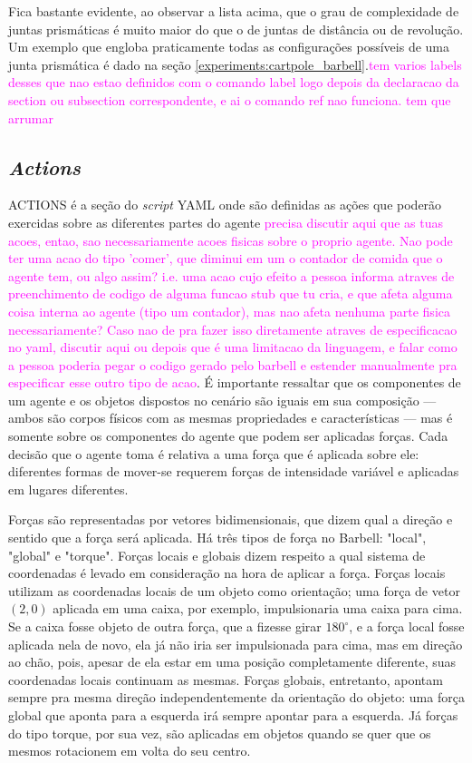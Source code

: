 \documentclass[cic,tc]{iiufrgs}
\newcommand\bruno[1]{\textcolor{magenta}{#1}}
\begin{document}
Fica bastante evidente, ao observar a lista acima, que o grau de complexidade de juntas prismáticas é muito maior do que o de juntas de distância ou de
revolução. Um exemplo que engloba praticamente todas as configurações possíveis de uma junta prismática é dado na seção \ref{experiments:cartpole_barbell}.\bruno{tem varios labels desses que nao estao definidos com o comando label logo depois da declaracao da section ou subsection correspondente, e ai o comando ref nao funciona. tem que arrumar}

\subsection{\textit{Actions}}
ACTIONS é a seção do \textit{script} YAML onde são definidas as ações que poderão exercidas sobre as diferentes partes do agente \bruno{precisa discutir aqui que as tuas acoes, entao, sao necessariamente acoes fisicas sobre o proprio agente. Nao pode ter uma acao do tipo 'comer', que diminui em um o contador de comida que o agente tem, ou algo assim? i.e. uma acao cujo efeito a pessoa informa atraves de preenchimento de codigo de alguma funcao stub que tu cria, e que afeta alguma coisa interna ao agente (tipo um contador), mas nao afeta nenhuma parte fisica necessariamente? Caso nao de pra fazer isso diretamente atraves de especificacao no yaml, discutir aqui ou depois que é uma limitacao da linguagem, e falar como a pessoa poderia pegar o codigo gerado pelo barbell e estender manualmente pra especificar esse outro tipo de acao}. É importante ressaltar que
os componentes de um agente e os objetos dispostos no cenário são iguais em sua composição --- ambos são corpos físicos com as mesmas propriedades e características ---
mas é somente sobre os componentes do agente que podem ser aplicadas forças. Cada decisão que o agente toma é relativa a uma força que é aplicada sobre ele:
diferentes formas de mover-se requerem forças de intensidade variável e aplicadas em lugares diferentes.


Forças são representadas por vetores bidimensionais, que dizem qual a direção e sentido que a força será aplicada. Há três tipos de força no Barbell: "local", "global"
e "torque". Forças locais e globais dizem respeito a qual sistema de coordenadas é levado em consideração na hora de aplicar a força. Forças locais utilizam
as coordenadas locais de um objeto como orientação; uma força de vetor $(2,0)$ aplicada em uma caixa, por exemplo, impulsionaria uma caixa para cima. Se a caixa
fosse objeto de outra força, que a fizesse girar $180^\circ$, e a força local fosse aplicada nela de novo, ela já não iria ser impulsionada para cima, mas em
direção ao chão, pois, apesar de ela estar em uma posição completamente diferente, suas coordenadas locais continuam as mesmas. Forças globais, entretanto,
apontam sempre pra mesma direção independentemente da orientação do objeto: uma força global que aponta para a esquerda irá sempre apontar para a esquerda.
Já forças do tipo torque, por sua vez, são aplicadas em objetos quando se quer que os mesmos rotacionem em volta do seu centro.
\end{document}
